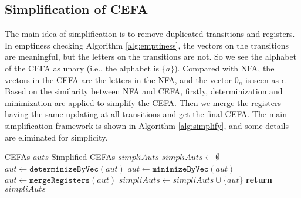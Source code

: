 \documentclass[sigconf]{acmart}
\newcommand*{\myvec}[1]{\bar{#1}}
\newcommand*{\algfun}[1]{\texttt{#1}}
\begin{document}
\subsection{Simplification of CEFA}
The main idea of simplification is to remove duplicated transitions and registers. In emptiness checking Algorithm \ref{alg:emptiness}, the vectors on the transitions are meaningful, but the letters on the transitions are not. So we see the alphabet of the CEFA as unary (i.e., the alphabet is $\{a\}$). Compared with NFA, the vectors in the CEFA are the letters in the NFA, and the vector $\myvec{0}_n$ is seen as $\epsilon$. Based on the similarity between NFA and CEFA, firstly, determinization and minimization \cite{aut_hopcraft} are applied to simplify the CEFA. Then we merge the registers having the same updating at all transitions and get the final CEFA. The main simplification framework is shown in Algorithm \ref{alg:simplify}, and some details are eliminated for simplicity.
\begin{algorithm}
  \caption{$\algfun{simplify}(auts)$}
  \label{alg:simplify}
  \begin{algorithmic}[1]
    \Require CEFAs $auts$
    \Ensure Simplified CEFAs $simpliAuts$
    \Statex
    \State $simpliAuts \gets \emptyset$
      \State $aut \gets \algfun{determinizeByVec}(aut)$
      \State $aut \gets \algfun{minimizeByVec}(aut)$
      \State $aut \gets \algfun{mergeRegisters}(aut)$
      \State $simpliAuts \gets simpliAuts \cup \{aut\}$
    \EndFor
    \State \textbf{return} $simpliAuts$
  \end{algorithmic}
\end{algorithm}
\end{document}
